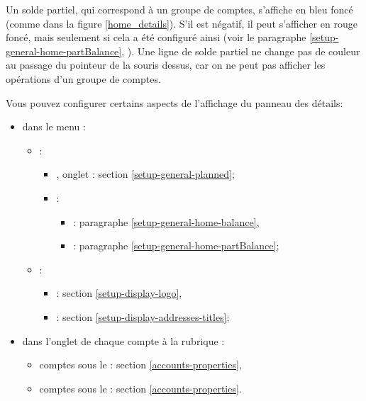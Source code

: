 Un solde partiel, qui correspond à un groupe de comptes, s'affiche en \textcolor[RGB]{40,40,255}{bleu foncé} (comme dans la figure \vref{home_details}). S'il est négatif, il peut s'afficher en \textcolor[RGB]{153,0,0}{rouge foncé}, mais seulement si cela a été configuré ainsi (voir le paragraphe \vref{setup-general-home-partBalance}, ). Une ligne de solde partiel ne change pas de couleur au passage du pointeur de la souris dessus, car on ne peut pas afficher les opérations d'un groupe de comptes.

Vous pouvez configurer certains aspects de l'affichage du panneau des détails:
\begin{itemize}
	\item dans le menu :%
		\begin{itemize}
			\item {}:
				\begin{itemize}
					\item {}, onglet : section \vref{setup-general-planned};
					\item {}:
						\begin{itemize}
							\item {}: paragraphe \vref{setup-general-home-balance},
							\item {}: paragraphe \vref{setup-general-home-partBalance};
						\end{itemize}
				\end{itemize}
			\item {}:
				\begin{itemize}
					\item {}: section \vref{setup-display-logo},
					\item {}: section \vref{setup-display-addresses-titles};
				\end{itemize}
		\end{itemize}
	\item dans l'onglet  de chaque compte à la rubrique :
		\begin{itemize}
			 \item comptes sous le : section \vref{accounts-properties},
			 \item comptes sous le : section \vref{accounts-properties}.
		\end{itemize}
\end{itemize}


